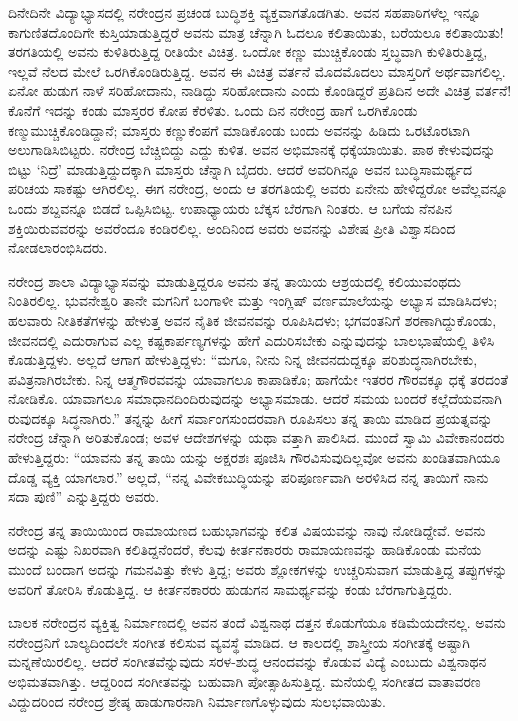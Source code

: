 ದಿನೇದಿನೇ ವಿದ್ಯಾಭ್ಯಾಸದಲ್ಲಿ ನರೇಂದ್ರನ ಪ್ರಚಂಡ ಬುದ್ಧಿಶಕ್ತಿ ವ್ಯಕ್ತವಾಗತೊಡಗಿತು. ಅವನ ಸಹಪಾಠಿಗಳೆಲ್ಲ ಇನ್ನೂ ಕಾಗುಣಿತದೊಂದಿಗೇ ಕುಸ್ತಿಯಾಡುತ್ತಿದ್ದರೆ ಅವನು ಮಾತ್ರ ಚೆನ್ನಾಗಿ ಓದಲೂ ಕಲಿತಾಯಿತು, ಬರೆಯಲೂ ಕಲಿತಾಯಿತು! ತರಗತಿಯಲ್ಲಿ ಅವನು ಕುಳಿತಿರುತ್ತಿದ್ದ ರೀತಿಯೇ ವಿಚಿತ್ರ. ಒಂದೋ ಕಣ್ಣು ಮುಚ್ಚಿಕೊಂಡು ಸ್ತಬ್ಧವಾಗಿ ಕುಳಿತಿರುತ್ತಿದ್ದ, ಇಲ್ಲವೆ ನೆಲದ ಮೇಲೆ ಒರಗಿಕೊಂಡಿರುತ್ತಿದ್ದ. ಅವನ ಈ ವಿಚಿತ್ರ ವರ್ತನೆ ಮೊದಮೊದಲು ಮಾಸ್ತರಿಗೆ ಅರ್ಥವಾಗಲಿಲ್ಲ. ಏನೋ ಹುಡುಗ ನಾಳೆ ಸರಿಹೋದಾನು, ನಾಡಿದ್ದು ಸರಿಹೋದಾನು ಎಂದು ಕೊಂಡಿದ್ದರೆ ಪ್ರತಿದಿನ ಅದೇ ವಿಚಿತ್ರ ವರ್ತನೆ! ಕೊನೆಗೆ ಇದನ್ನು ಕಂಡು ಮಾಸ್ತರರ ಕೋಪ ಕೆರಳಿತು. ಒಂದು ದಿನ ನರೇಂದ್ರ ಹಾಗೆ ಒರಗಿಕೊಂಡು ಕಣ್ಮುಮುಚ್ಚಿಕೊಂಡಿದ್ದಾನೆ; ಮಾಸ್ತರು ಕಣ್ಣುಕೆಂಪಗೆ ಮಾಡಿಕೊಂಡು ಬಂದು ಅವನನ್ನು ಹಿಡಿದು ಒರಟೊರಟಾಗಿ ಅಲುಗಾಡಿಸಿಬಿಟ್ಟರು. ನರೇಂದ್ರ ಬೆಚ್ಚಿಬಿದ್ದು ಎದ್ದು ಕುಳಿತ. ಅವನ ಅಭಿಮಾನಕ್ಕೆ ಧಕ್ಕೆಯಾಯಿತು. ಪಾಠ ಕೇಳುವುದನ್ನು ಬಿಟ್ಟು ‘ನಿದ್ರೆ’ ಮಾಡುತ್ತಿದ್ದುದಕ್ಕಾಗಿ ಮಾಸ್ತರು ಚೆನ್ನಾಗಿ ಬೈದರು. ಆದರೆ ಅವರಿಗಿನ್ನೂ ಅವನ ಬುದ್ಧಿಸಾಮರ್ಥ್ಯದ ಪರಿಚಯ ಸಾಕಷ್ಟು ಆಗಿರಲಿಲ್ಲ. ಈಗ ನರೇಂದ್ರ, ಅಂದು ಆ ತರಗತಿಯಲ್ಲಿ ಅವರು ಏನೇನು ಹೇಳಿದ್ದರೋ ಅವೆಲ್ಲವನ್ನೂ ಒಂದು ಶಬ್ದವನ್ನೂ ಬಿಡದೆ ಒಪ್ಪಿಸಿಬಿಟ್ಟ. ಉಪಾಧ್ಯಾಯರು ಬೆಕ್ಕಸ ಬೆರಗಾಗಿ ನಿಂತರು. ಆ ಬಗೆಯ ನೆನಪಿನ ಶಕ್ತಿಯಿರುವವರನ್ನು ಅವರೆಂದೂ ಕಂಡಿರಲಿಲ್ಲ. ಅಂದಿನಿಂದ ಅವರು ಅವನನ್ನು ವಿಶೇಷ ಪ್ರೀತಿ ವಿಶ್ವಾಸದಿಂದ ನೋಡಲಾರಂಭಿಸಿದರು.

ನರೇಂದ್ರ ಶಾಲಾ ವಿದ್ಯಾಭ್ಯಾಸವನ್ನು ಮಾಡುತ್ತಿದ್ದರೂ ಅವನು ತನ್ನ ತಾಯಿಯ ಆಶ್ರಯದಲ್ಲಿ ಕಲಿಯುವಂಥದು ನಿಂತಿರಲಿಲ್ಲ. ಭುವನೇಶ್ವರಿ ತಾನೇ ಮಗನಿಗೆ ಬಂಗಾಳೀ ಮತ್ತು ಇಂಗ್ಲಿಷ್ ವರ್ಣಮಾಲೆಯನ್ನು ಅಭ್ಯಾಸ ಮಾಡಿಸಿದಳು; ಹಲವಾರು ನೀತಿಕತೆಗಳನ್ನು ಹೇಳುತ್ತ ಅವನ ನೈತಿಕ ಜೀವನವನ್ನು ರೂಪಿಸಿದಳು; ಭಗವಂತನಿಗೆ ಶರಣಾಗಿದ್ದುಕೊಂಡು, ಜೀವನದಲ್ಲಿ ಎದುರಾಗುವ ಎಲ್ಲ ಕಷ್ಟಕಾರ್ಪಣ್ಯಗಳನ್ನು ಹೇಗೆ ಎದುರಿಸಬೇಕು ಎನ್ನುವುದನ್ನು ಬಾಲಭಾಷೆಯಲ್ಲಿ ತಿಳಿಸಿ ಕೊಡುತ್ತಿದ್ದಳು. ಅಲ್ಲದೆ ಆಗಾಗ ಹೇಳುತ್ತಿದ್ದಳು: “ಮಗೂ, ನೀನು ನಿನ್ನ ಜೀವನದುದ್ದಕ್ಕೂ ಪರಿಶುದ್ಧನಾಗಿರಬೇಕು, ಪವಿತ್ರನಾಗಿರಬೇಕು. ನಿನ್ನ ಆತ್ಮಗೌರವವನ್ನು ಯಾವಾಗಲೂ ಕಾಪಾಡಿಕೊ; ಹಾಗೆಯೇ ಇತರರ ಗೌರವಕ್ಕೂ ಧಕ್ಕೆ ತರದಂತೆ ನೋಡಿಕೊ. ಯಾವಾಗಲೂ ಸಮಾಧಾನದಿಂದಿರುವುದನ್ನು ಅಭ್ಯಾಸಮಾಡು. ಆದರೆ ಸಮಯ ಬಂದರೆ ಕಲ್ಲೆದೆಯವನಾಗಿ ರುವುದಕ್ಕೂ ಸಿದ್ಧನಾಗಿರು.” ತನ್ನನ್ನು ಹೀಗೆ ಸರ್ವಾಂಗಸುಂದರವಾಗಿ ರೂಪಿಸಲು ತನ್ನ ತಾಯಿ ಮಾಡಿದ ಪ್ರಯತ್ನವನ್ನು ನರೇಂದ್ರ ಚೆನ್ನಾಗಿ ಅರಿತುಕೊಂಡ; ಅವಳ ಆದೇಶಗಳನ್ನು ಯಥಾ ವತ್ತಾಗಿ ಪಾಲಿಸಿದ. ಮುಂದೆ ಸ್ವಾಮಿ ವಿವೇಕಾನಂದರು ಹೇಳುತ್ತಿದ್ದರು: “ಯಾವನು ತನ್ನ ತಾಯಿ ಯನ್ನು ಅಕ್ಷರಶಃ ಪೂಜಿಸಿ ಗೌರವಿಸುವುದಿಲ್ಲವೋ ಅವನು ಖಂಡಿತವಾಗಿಯೂ ದೊಡ್ಡ ವ್ಯಕ್ತಿ ಯಾಗಲಾರ.” ಅಲ್ಲದೆ, “ನನ್ನ ವಿವೇಕಬುದ್ಧಿಯನ್ನು ಪರಿಪೂರ್ಣವಾಗಿ ಅರಳಿಸಿದ ನನ್ನ ತಾಯಿಗೆ ನಾನು ಸದಾ ಪುಣಿ” ಎನ್ನುತ್ತಿದ್ದರು ಅವರು.

ನರೇಂದ್ರ ತನ್ನ ತಾಯಿಯಿಂದ ರಾಮಾಯಣದ ಬಹುಭಾಗವನ್ನು ಕಲಿತ ವಿಷಯವನ್ನು ನಾವು ನೋಡಿದ್ದೇವೆ. ಅವನು ಅದನ್ನು ಎಷ್ಟು ನಿಖರವಾಗಿ ಕಲಿತಿದ್ದನೆಂದರೆ, ಕೆಲವು ಕೀರ್ತನಕಾರರು ರಾಮಾಯಣವನ್ನು ಹಾಡಿಕೊಂಡು ಮನೆಯ ಮುಂದೆ ಬಂದಾಗ ಅದನ್ನು ಗಮನವಿತ್ತು ಕೇಳು ತ್ತಿದ್ದ; ಅವರು ಶ್ಲೋಕಗಳನ್ನು ಉಚ್ಚರಿಸುವಾಗ ಮಾಡುತ್ತಿದ್ದ ತಪ್ಪುಗಳನ್ನು ಅವರಿಗೆ ತೋರಿಸಿ ಕೊಡುತ್ತಿದ್ದ. ಆ ಕೀರ್ತನಕಾರರು ಹುಡುಗನ ಸಾಮರ್ಥ್ಯವನ್ನು ಕಂಡು ಬೆರಗಾಗುತ್ತಿದ್ದರು.

ಬಾಲಕ ನರೇಂದ್ರನ ವ್ಯಕ್ತಿತ್ವ ನಿರ್ಮಾಣದಲ್ಲಿ ಅವನ ತಂದೆ ವಿಶ್ವನಾಥ ದತ್ತನ ಕೊಡುಗೆಯೂ ಕಡಿಮೆಯದೇನಲ್ಲ. ಅವನು ನರೇಂದ್ರನಿಗೆ ಬಾಲ್ಯದಿಂದಲೇ ಸಂಗೀತ ಕಲಿಸುವ ವ್ಯವಸ್ಥೆ ಮಾಡಿದ. ಆ ಕಾಲದಲ್ಲಿ ಶಾಸ್ತ್ರೀಯ ಸಂಗೀತಕ್ಕೆ ಅಷ್ಟಾಗಿ ಮನ್ನಣೆಯಿರಲಿಲ್ಲ. ಆದರೆ ಸಂಗೀತವೆನ್ನುವುದು ಸರಳ-ಶುದ್ಧ ಆನಂದವನ್ನು ಕೊಡುವ ವಿದ್ಯೆ ಎಂಬುದು ವಿಶ್ವನಾಥನ ಅಭಿಮತವಾಗಿತ್ತು. ಆದ್ದರಿಂದ ಸಂಗೀತವನ್ನು ಬಹುವಾಗಿ ಪೋತ್ಸಾಹಿಸುತ್ತಿದ್ದ. ಮನೆಯಲ್ಲಿ ಸಂಗೀತದ ವಾತಾವರಣ ವಿದ್ದುದರಿಂದ ನರೇಂದ್ರ ಶ್ರೇಷ್ಠ ಹಾಡುಗಾರನಾಗಿ ನಿರ್ಮಾಣಗೊಳ್ಳುವುದು ಸುಲಭವಾಯಿತು.

